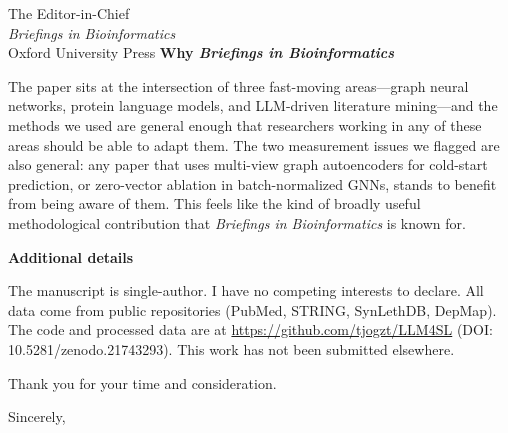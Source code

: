 \documentclass[12pt,a4paper]{letter}
\begin{document}
\begin{letter}{The Editor-in-Chief\\
\textit{Briefings in Bioinformatics}\\
Oxford University Press}
\medskip
\noindent\textbf{Why \textit{Briefings in Bioinformatics}}

The paper sits at the intersection of three fast-moving areas---graph neural networks, protein language models, and LLM-driven literature mining---and the methods we used are general enough that researchers working in any of these areas should be able to adapt them. The two measurement issues we flagged are also general: any paper that uses multi-view graph autoencoders for cold-start prediction, or zero-vector ablation in batch-normalized GNNs, stands to benefit from being aware of them. This feels like the kind of broadly useful methodological contribution that \textit{Briefings in Bioinformatics} is known for.

\medskip
\noindent\textbf{Additional details}

The manuscript is single-author. I have no competing interests to declare. All data come from public repositories (PubMed, STRING, SynLethDB, DepMap). The code and processed data are at \url{https://github.com/tjogzt/LLM4SL} (DOI: 10.5281/zenodo.21743293). This work has not been submitted elsewhere.

\medskip
Thank you for your time and consideration.

\medskip
\closing{Sincerely,}

\end{letter}
\end{document}
